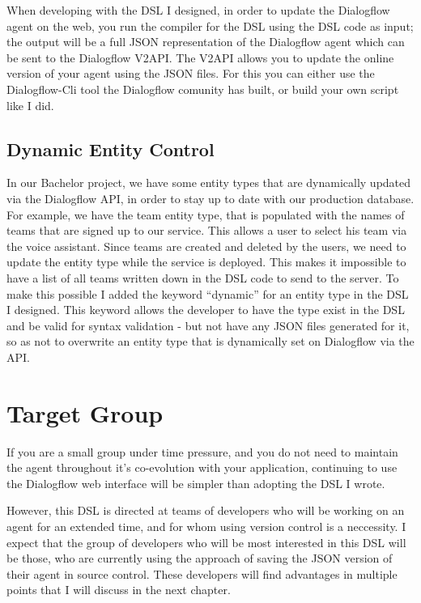 When developing with the DSL I designed, in order to update the Dialogflow agent on the web, you run the compiler for the DSL using the DSL code as input; the output will be a full JSON representation of the Dialogflow agent which can be sent to the Dialogflow V2API.
The V2API allows you to update the online version of your agent using the JSON files. For this you can either use the Dialogflow-Cli tool \cite{Charles2018} the Dialogflow comunity has built, or build your own script like I did.

\subsection{Dynamic Entity Control}

In our Bachelor project, we have some entity types that are dynamically updated via the Dialogflow API, in order to stay up to date with our production database. For example, we have the team entity type, that is populated with the names of teams that are signed up to our service. This allows a user to select his team via the voice assistant.
Since teams are created and deleted by the users, we need to update the entity type while the service is deployed.
This makes it impossible to have a list of all teams written down in the DSL code to send to the server. 
To make this possible I added the keyword “dynamic” for an entity type in the DSL I designed.
This keyword allows the developer to have the type exist in the DSL and be valid for syntax validation - but not have any JSON files generated for it, so as not to overwrite an entity type that is dynamically set on Dialogflow via the API.

\section{Target Group}

If you are a small group under time pressure, and you do not need to maintain the agent throughout it's co-evolution with your application, continuing to use the Dialogflow web interface will be simpler than adopting the DSL I wrote.

However, this DSL is directed at teams of developers who will be working on an agent for an extended time, and for whom using version control is a neccessity.
I expect that the group of developers who will be most interested in this DSL will be those, who are currently using the approach of saving the JSON  version of their agent in source control.
These developers will find advantages in multiple points that I will discuss in the next chapter.


